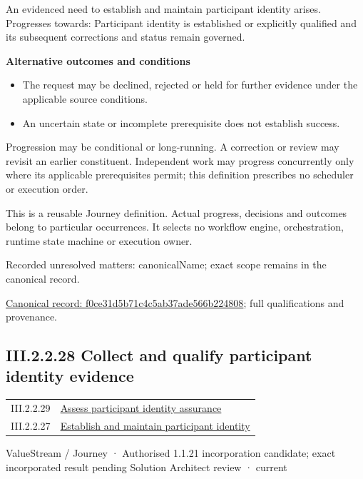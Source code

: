 An evidenced need to establish and maintain participant identity arises. Progresses towards: Participant identity is established or explicitly qualified and its subsequent corrections and status remain governed.



\par\medskip\textbf{Alternative outcomes and conditions}\par


\begin{itemize}


\item The request may be declined, rejected or held for further evidence under the applicable source conditions.

\item An uncertain state or incomplete prerequisite does not establish success.

\end{itemize}


Progression may be conditional or long-running. A correction or review may revisit an earlier constituent. Independent work may progress concurrently only where its applicable prerequisites permit; this definition prescribes no scheduler or execution order.



This is a reusable Journey definition. Actual progress, decisions and outcomes belong to particular occurrences. It selects no workflow engine, orchestration, runtime state machine or execution owner.


{\small Recorded unresolved matters: canonicalName; exact scope remains in the canonical record.}\par
{\footnotesize \href{../../../../../../../continuum/strategy/value-stream/f0ce31d5b71c4c5ab37ade566b224808.md}{Canonical record: f0ce31d5b71c4c5ab37ade566b224808}; full qualifications and provenance.}\par
\subsection*{III.2.2.28 Collect and qualify participant identity evidence}
\label{navigation:III.2.2.28}

\begin{longtable}{p{.22\linewidth}p{.73\linewidth}}
III.2.2.29 & \hyperref[element:215676da8a3040bba2fa02574a4c3443]{Assess participant identity assurance} \\
III.2.2.27 & \hyperref[element:f0ce31d5b71c4c5ab37ade566b224808]{Establish and maintain participant identity} \\
\end{longtable}
\label{element:d3db9d9c27394b99bab78a34b395316a}
{\small ValueStream / Journey · Authorised 1.1.21 incorporation candidate; exact incorporated result pending Solution Architect review · current}\par


